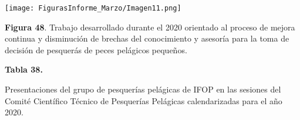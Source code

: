 \documentclass[
  spanish,
]{article}
\begin{document}
\begin{center}
\texttt{[image: FigurasInforme\_Marzo/Imagen11.png]}
\end{center}

\small

\textbf{Figura 48}. Trabajo desarrollado durante el 2020 orientado al
proceso de mejora continua y disminución de brechas del conocimiento y
asesoría para la toma de decisión de pesquerás de peces pelágicos
pequeños. \vspace{0.5cm} \normalsize

\pagebreak

\small
\begin{center} 
\textbf{Tabla 38.}
\end{center}
\begin{center} 
\vspace{-0.2cm} Presentaciones del grupo de pesquerías pelágicas de IFOP en las sesiones del Comité Científico Técnico de Pesquerías Pelágicas calendarizadas para el año 2020.
\end{center}
\vspace{-0.2cm}
\end{document}
